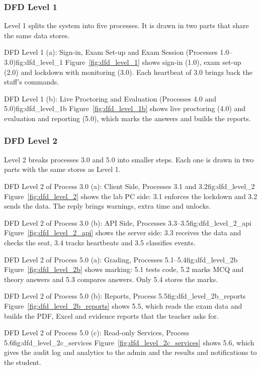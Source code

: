 \subsubsection{DFD Level 1}
Level 1 splits the system into five processes. It is drawn in two parts that share the same data stores.

%
{DFD Level 1 (a): Sign-in, Exam Set-up and Exam Session (Processes 1.0--3.0)}{fig:dfd_level_1}%
{Figure~\ref{fig:dfd_level_1} shows sign-in (1.0), exam set-up (2.0) and lockdown with monitoring (3.0). Each heartbeat of 3.0 brings back the staff's commands.}

%
{DFD Level 1 (b): Live Proctoring and Evaluation (Processes 4.0 and 5.0)}{fig:dfd_level_1b}%
{Figure~\ref{fig:dfd_level_1b} shows live proctoring (4.0) and evaluation and reporting (5.0), which marks the answers and builds the reports.}

\subsubsection{DFD Level 2}
Level 2 breaks processes 3.0 and 5.0 into smaller steps. Each one is drawn in two parts with the same stores as Level 1.

%
{DFD Level 2 of Process 3.0 (a): Client Side, Processes 3.1 and 3.2}{fig:dfd_level_2}%
{Figure~\ref{fig:dfd_level_2} shows the lab PC side: 3.1 enforces the lockdown and 3.2 sends the data. The reply brings warnings, extra time and unlocks.}

%
{DFD Level 2 of Process 3.0 (b): API Side, Processes 3.3--3.5}{fig:dfd_level_2_api}%
{Figure~\ref{fig:dfd_level_2_api} shows the server side: 3.3 receives the data and checks the seat, 3.4 tracks heartbeats and 3.5 classifies events.}

%
{DFD Level 2 of Process 5.0 (a): Grading, Processes 5.1--5.4}{fig:dfd_level_2b}%
{Figure~\ref{fig:dfd_level_2b} shows marking: 5.1 tests code, 5.2 marks MCQ and theory answers and 5.3 compares answers. Only 5.4 stores the marks.}

%
{DFD Level 2 of Process 5.0 (b): Reports, Process 5.5}{fig:dfd_level_2b_reports}%
{Figure~\ref{fig:dfd_level_2b_reports} shows 5.5, which reads the exam data and builds the PDF, Excel and evidence reports that the teacher asks for.}

%
{DFD Level 2 of Process 5.0 (c): Read-only Services, Process 5.6}{fig:dfd_level_2c_services}%
{Figure~\ref{fig:dfd_level_2c_services} shows 5.6, which gives the audit log and analytics to the admin and the results and notifications to the student.}
